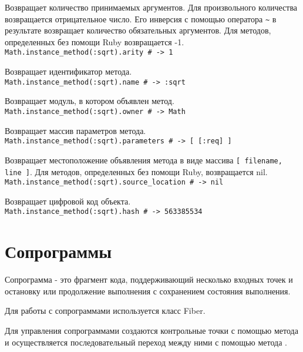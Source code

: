 \begin{methodlist}
  Возвращает количество принимаемых аргументов. Для произвольного количества возвращается отрицательное число. Его инверсия с помощью оператора \verb!~! в результате возвращает количество обязательных аргументов. Для методов, определенных без помощи Ruby возвращается -1.
  \\\verb!Math.instance_method(:sqrt).arity # -> 1!

  Возвращает идентификатор метода.
  \\\verb!Math.instance_method(:sqrt).name # -> :sqrt!

  Возвращает модуль, в котором объявлен метод.
  \\\verb!Math.instance_method(:sqrt).owner # -> Math!

  Возвращает массив параметров метода.
  \\\verb!Math.instance_method(:sqrt).parameters # -> [ [:req] ]!

  Возвращает местоположение объявления метода в виде массива \verb![ filename, line ]!. Для методов, определенных без помощи Ruby, возвращается nil.  
  \\\verb!Math.instance_method(:sqrt).source_location # -> nil!

  Возвращает цифровой код объекта.
  \\\verb!Math.instance_method(:sqrt).hash # -> 563385534!
\end{methodlist}

\section{Сопрограммы}

Сопрограмма - это фрагмент кода, поддерживающий несколько входных точек и остановку или продолжение выполнения с сохранением состояния выполнения. 

Для работы с сопрограммами используется класс Fiber.

Для управления сопрограммами создаются контрольные точки с помощью метода  и осуществляется последовательный переход между ними с помощью метода .

